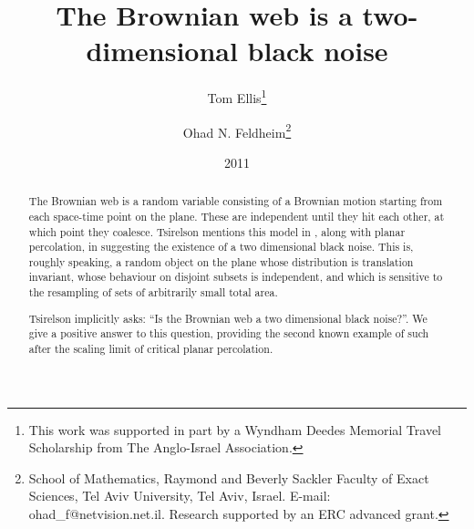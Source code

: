 \newcommand{\sigfield}{$\sigma$-field}
{
\title{The Brownian web is a two-dimensional black noise}

\newcommand{\tomthanks}{This work was supported in part by
a Wyndham Deedes Memorial Travel Scholarship from The Anglo-Israel
Association.}

\newcommand{\ohadthanks}{School of Mathematics, Raymond and Beverly Sackler Faculty of Exact
Sciences, Tel Aviv University, Tel Aviv, Israel. E-mail:
ohad\_f@netvision.net.il. Research supported by an ERC advanced grant.}

\author{Tom Ellis\thanks{\tomthanks}\\%
\and Ohad N. Feldheim\thanks{\ohadthanks}}

\date{2011}

\maketitle

\begin{abstract}
The Brownian web is a random variable consisting of a Brownian motion
starting from each space-time point on the plane.  These are
independent until they hit each other, at which point they coalesce.
Tsirelson mentions this model in
\cite{tsirelson-scaling-limit-noise-stability}, along with planar
percolation, in suggesting the existence of a two dimensional black
noise.  This is, roughly speaking, a random object on the plane whose
distribution is translation invariant, whose behaviour on disjoint
subsets is independent, and which is sensitive to the resampling of
sets of arbitrarily small total area.

Tsirelson implicitly asks: ``Is the
Brownian web a two dimensional black noise?''.  We give a positive
answer to this question, providing the second known example of such
after the scaling limit of critical planar percolation.
\end{abstract}

}

